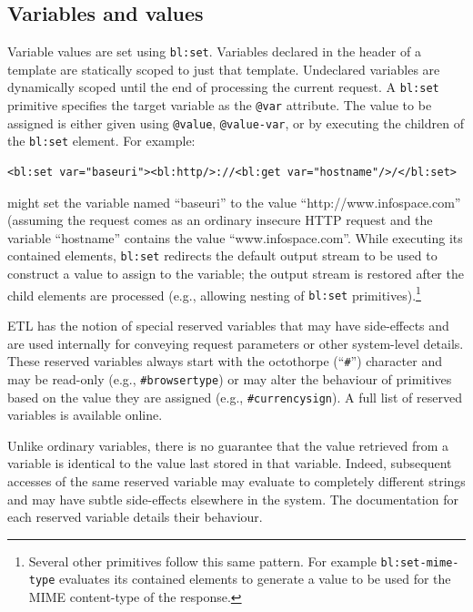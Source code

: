\documentclass{www2003-submission}
\newcommand{\smtexttt}[1]{{\small\texttt{#1}}}
\begin{document}
\subsection{Variables and values}
\label{ssec-variables}

Variable values are set using \smtexttt{bl:set}.  Variables
declared in the header of a template are statically scoped to just
that template.   Undeclared variables are dynamically scoped until the
end of processing the current request.  A \smtexttt{bl:set} primitive
specifies the target variable as the \smtexttt{@var} attribute. The
value to be assigned is either given using \smtexttt{@value},
\smtexttt{@value-var}, or by executing the children of the
\smtexttt{bl:set} element.  For example:

\begin{verbatim}
<bl:set var="baseuri"><bl:http/>://<bl:get var="hostname"/>/</bl:set>
\end{verbatim}

\noindent might set the variable named ``baseuri'' to the value
``http://www.infospace.com'' (assuming the request comes as an
ordinary insecure HTTP request and the variable ``hostname'' contains
the value ``www.infospace.com''.  While executing its contained
elements, \smtexttt{bl:set} redirects the default output stream to be
used to construct a value to assign to the variable; the output stream
is restored after the child elements are processed (e.g., allowing
nesting of \smtexttt{bl:set} primitives).\footnote{Several other
primitives follow this same pattern.  For example
\smtexttt{bl:set-mime-type} evaluates its contained elements to
generate a value to be used for the MIME content-type of the
response.}

ETL has the notion of special reserved variables that may have
side-effects and are used internally for conveying request parameters or
other system-level details.  These reserved variables always start with
the octothorpe (``\smtexttt{\#}'') character and may be read-only (e.g.,
\smtexttt{\#browsertype}) or may alter the behaviour of primitives based
on the value they are assigned (e.g., \smtexttt{\#currencysign}).  A
full list of reserved variables is available
online.~\cite{etl-reserved-variables}

Unlike ordinary variables, there is no guarantee that the value
retrieved from a variable is identical to the value last stored in that
variable.  Indeed, subsequent accesses of the same reserved
variable may evaluate to completely different strings and may have
subtle side-effects elsewhere in the system.  The documentation for each
reserved variable details their behaviour.
\end{document}
